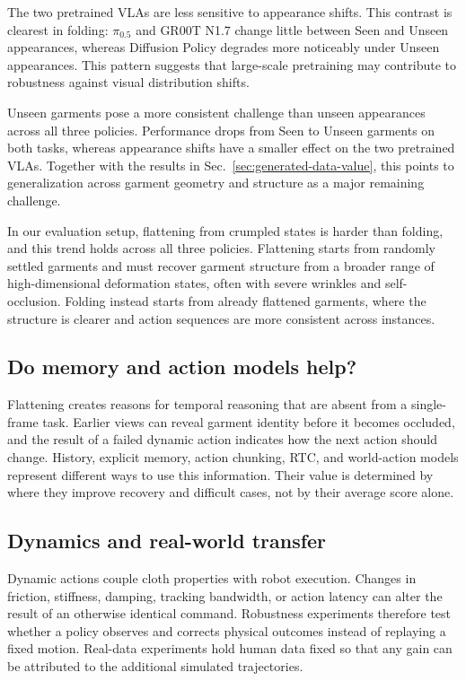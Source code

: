 The two pretrained VLAs are less sensitive to appearance shifts. This contrast
is clearest in folding: $\pi_{0.5}$ and GR00T N1.7 change little between Seen
and Unseen appearances, whereas Diffusion Policy degrades more noticeably under
Unseen appearances. This pattern suggests that large-scale pretraining may
contribute to robustness against visual distribution shifts.

Unseen garments pose a more consistent challenge than unseen appearances
across all three policies. Performance drops from Seen to Unseen garments on
both tasks, whereas appearance shifts have a smaller effect on the two
pretrained VLAs. Together with the results in
Sec.~\ref{sec:generated-data-value}, this points to generalization across garment
geometry and structure as a major remaining challenge.

In our evaluation setup, flattening from crumpled states is harder than folding,
and this trend holds across all three policies. Flattening starts from randomly
settled garments and must recover garment structure from a broader range of
high-dimensional deformation states, often with severe wrinkles and
self-occlusion. Folding instead starts from already flattened garments, where
the structure is clearer and action sequences are more consistent across
instances.

\subsection{Do memory and action models help?}

Flattening creates reasons for temporal reasoning that are absent from a
single-frame task. Earlier views can reveal garment identity before it becomes
occluded, and the result of a failed dynamic action indicates how the next
action should change. History, explicit memory, action chunking, RTC, and
world-action models represent different ways to use this information. Their
value is determined by where they improve recovery and difficult cases, not by
their average score alone.

\subsection{Dynamics and real-world transfer}

Dynamic actions couple cloth properties with robot execution. Changes in
friction, stiffness, damping, tracking bandwidth, or action latency can alter
the result of an otherwise identical command. Robustness experiments therefore
test whether a policy observes and corrects physical outcomes instead of
replaying a fixed motion. Real-data experiments hold human data fixed so that
any gain can be attributed to the additional simulated trajectories.
